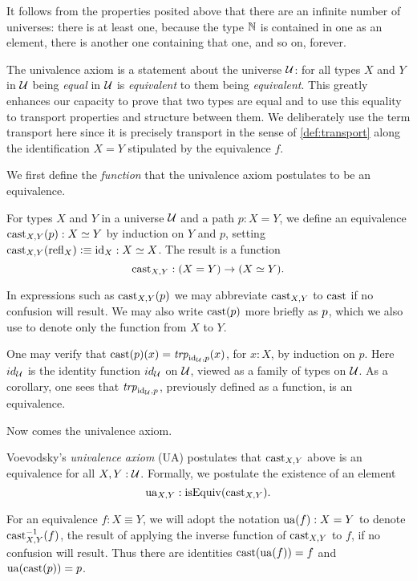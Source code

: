 It follows from the properties posited above that there are an infinite number of universes: there is at least one, because the type $\mathbb{N}$ is
contained in one as an element, there is another one containing that one, and so on, forever.

The univalence axiom is a statement about the universe ${\mathcal{U}}$: 
for all types $X$ and $Y$ in ${\mathcal{U}}$ being \emph{equal} in ${\mathcal{U}}$ is 
\emph{equivalent} to them being \emph{equivalent}. This greatly
enhances our capacity to prove that two types are equal
and to use this equality to transport properties and structure
between them. We deliberately use the term transport
here since it is precisely transport in the sense of
\cref{def:transport} along the identification
$X = Y$ stipulated by the equivalence $f$.

We first define the \emph{function} that
the univalence axiom postulates to be an equivalence.

\begin{definition}\label{def:idtoeq}
  For types $X$ and $Y$ in a universe ${\mathcal{U}}$ and a path $p : X = Y$, we define an equivalence $\cast_{X,Y} (p) : X\equiv Y$ by induction on $Y$ and $p$, setting
  $\cast_{X,Y} (\refl X) \defeq \id_X : X \equiv X$.  The result is a function \[ \cast_{X,Y} : (X = Y) \to (X\equiv Y). \]
\end{definition}
  
In expressions such as $\cast_{X,Y}(p)$ we may abbreviate $\cast_{X,Y}$ to $\cast$ if 
no confusion will result. We may also write $\cast (p)$ more briefly as ${p}$, 
which we also use to denote only the function from $X$ to $Y$.

One may verify that $\cast(p)(x) = \trp[\id_\UU]{ p} (x)$, for $x : X$, by induction on $p$.
Here $id_{\mathcal{U}}$ is the identity function $id_{\mathcal{U}}$ on ${\mathcal{U}}$, viewed as a family of types on ${\mathcal{U}}$. 
As a corollary, one sees that $\trp[\id_\UU]{ p}$, previously defined as a function, is an equivalence.

Now comes the univalence axiom.

\begin{definition}\label{def:univalence}
Voevodsky's \emph{univalence axiom} (UA) postulates that 
$\cast_{X,Y}$ above is an equivalence for all $X,Y:{\mathcal{U}}$.
Formally, we postulate the existence of an element \[ \ua_{X,Y} : \isEq(\cast_{X,Y}).\]
\end{definition}

For an equivalence $f: X\equiv Y$, we will adopt the notation $\ua(f) : X = Y $ to denote $\cast_{X,Y}^{-1}(f)$, the result of applying the
inverse function of $\cast_{X,Y}$ to $f$, if no confusion will result.  Thus there are identities $\cast (\ua (f)) = f$ and $\ua (\cast (p)) = p$.

